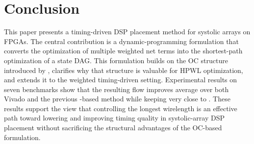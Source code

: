 \section{Conclusion}
\label{sec:conclusion}

This paper presents a timing-driven DSP placement method for systolic arrays on FPGAs. The central contribution is a dynamic-programming formulation that converts the optimization of multiple weighted net \hpwl terms into the shortest-path optimization of a state DAG. This formulation builds on the OC structure introduced by \rsad, clarifies why that structure is valuable for HPWL optimization, and extends it to the weighted timing-driven setting. Experimental results on seven benchmarks show that the resulting flow improves average \fmax over both Vivado and the previous \rsad-based method while keeping \hpwl very close to \rsad. These results support the view that controlling the longest wirelength is an effective path toward lowering \wns and improving timing quality in systolic-array DSP placement without sacrificing the structural advantages of the OC-based formulation.
